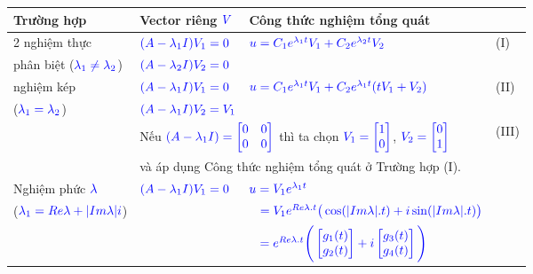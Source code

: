 \documentclass[a4paper]{article}
\begin{document}
\begin{table}[!htp]
        \centering   
    \begin{tabular}{llll}
    \toprule
    {\bfseries Trường hợp} & {\bfseries Vector riêng $\textcolor{blue}{V}$} & {\bfseries Công thức nghiệm tổng quát}\\
    \midrule
    2 nghiệm thực & $\textcolor{blue}{(A - \lambda\sb{1}I)V\sb{1} = 0}$  & $\textcolor{blue}{u = C\sb{1} e\sp{\lambda\sb{1}t}V\sb{1} + C\sb{2} e\sp{\lambda\sb{2}t}V\sb{2}}$ & (I)\\
    phân biệt ($\textcolor{blue}{\lambda \sb{1} \neq \lambda \sb{2}}$) & $\textcolor{blue}{(A - \lambda\sb{2}I)V\sb{2} = 0}$ & \\
    \addlinespace
    \midrule
    1 nghiệm kép & $\textcolor{blue}{(A - \lambda\sb{1}I)V\sb{1} = 0}$ & $\textcolor{blue}{u = C\sb{1} e\sp{\lambda\sb{1}t}V\sb{1} + C\sb{2} e\sp{\lambda\sb{1}t}(t V\sb{1} + V\sb{2})}$ & (II)\\
    ($\textcolor{blue}{\lambda \sb{1} = \lambda\sb{2}}$) & $\textcolor{blue}{(A - \lambda\sb{1}I)V\sb{2} = V\sb{1}}$\\
    \addlinespace
    \cmidrule{2-4}
    &\multicolumn{2}{l}{Nếu $\textcolor{blue}{(A - \lambda\sb{1}I) = \begin{bmatrix} 0 & 0 \\ 0 & 0\end{bmatrix}}$ thì ta chọn $\textcolor{blue}{V\sb{1} = {\begin{bmatrix} 1 \\ 0 \end{bmatrix}}}$, $\textcolor{blue}{V\sb{2} = {\begin{bmatrix} 0 \\ 1 \end{bmatrix}}}$} & (III)\\
    & \multicolumn{2}{l}{và áp dụng Công thức nghiệm tổng quát ở Trường hợp (I).}\\
    \addlinespace
    \midrule
    \addlinespace
    Nghiệm phức $\textcolor{blue}{\lambda}$ & $\textcolor{blue}{(A - \lambda\sb{1}I)V\sb{1} = 0}$ & $\textcolor{blue}{u = V\sb{1}e\sp{\lambda\sb{1}t}}$\\
    ($\textcolor{blue}{\lambda\sb{1} = Re \lambda + |Im \lambda| i}$) & & $\enskip \ \textcolor{blue}{= V\sb{1}e\sp{Re\lambda .t}\big(\cos (|Im\lambda| .t) + i\sin (|Im\lambda| .t)\big)}$\\
    & & $\enskip \ \textcolor{blue}{= e\sp{Re\lambda .t}\Bigg(\begin{bmatrix} g\sb{1}(t) \\ g\sb{2}(t) \end{bmatrix}  + i\begin{bmatrix} g\sb{3}(t)\\ g\sb{4}(t) \end{bmatrix}\Bigg)}$\\

\end{tabular}
\end{table}
\end{document}
